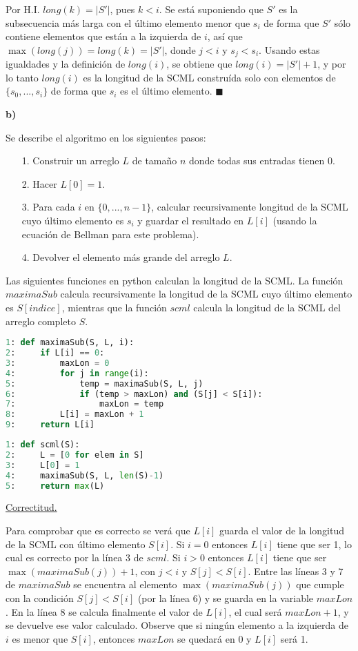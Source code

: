 \documentclass{article}
\begin{document}
Por H.I. $long(k) = |S'|$, pues $k < i$. Se está suponiendo que $S'$ es la subsecuencia más larga con el último elemento menor que $s_i$ de forma que $S'$ sólo contiene elementos que están a la izquierda de $i$, así que $\max (long(j)) = long(k) = |S'|$, donde $j<i$ y $s_j < s_i$. Usando estas igualdades y la definición de $long(i)$, se obtiene que $long(i) = |S'|+1$, y por lo tanto $long(i)$ es la longitud de la SCML construída solo con elementos de $\{ s_0, ..., s_i \}$ de forma que $s_i$ es el último elemento. $\blacksquare$

\textbf{b)}

Se describe el algoritmo en los siguientes pasos:

\begin{itemize}
\item[1.] Construir un arreglo $L$ de tamaño $n$ donde todas sus entradas tienen 0.
\item[2.] Hacer $L[0] = 1$.
\item[3.] Para cada $i$ en $\{0, ..., n-1\}$, calcular recursivamente longitud de la SCML cuyo último elemento es $s_i$ y guardar el resultado en $L[i]$ (usando la ecuación de Bellman para este problema).
\item[4.] Devolver el elemento más grande del arreglo $L$.
\end{itemize}

Las siguientes funciones en python calculan la longitud de la SCML. La función $maximaSub$ calcula recursivamente la longitud de la SCML cuyo último elemento es $S[indice]$, mientras que la función $scml$ calcula la longitud de la SCML del arreglo completo $S$.

\begin{lstlisting}[language=Python]
1: def maximaSub(S, L, i):
2:     if L[i] == 0:
3:         maxLon = 0
4:         for j in range(i):
5:             temp = maximaSub(S, L, j)
6:             if (temp > maxLon) and (S[j] < S[i]):
7:                 maxLon = temp
8:         L[i] = maxLon + 1
9:     return L[i]
\end{lstlisting}

\begin{lstlisting}[language=Python]
1: def scml(S):
2:     L = [0 for elem in S]
3:     L[0] = 1
4:     maximaSub(S, L, len(S)-1)
5:     return max(L)
\end{lstlisting}

\underline{Correctitud.}

Para comprobar que es correcto se verá que $L[i]$ guarda el valor de la longitud de la SCML con último elemento $S[i]$.
Si $i = 0$ entonces $L[i]$ tiene que ser 1, lo cual es correcto por la línea
3 de $scml$. Si $i>0$ entonces $L[i]$ tiene que ser $\max (maximaSub(j)) + 1$, con $j<i$ y $S[j] < S[i]$.
Entre las líneas 3 y 7 de $maximaSub$ se encuentra al elemento $\max (maximaSub(j))$ que cumple con la 
condición $S[j] < S[i]$ (por la línea 6) y se guarda en la variable $maxLon$. En la línea 8 se calcula
finalmente el valor de $L[i]$, el cual será $maxLon + 1$, y se devuelve ese valor calculado. Observe que si
ningún elemento a la izquierda de $i$ es menor que $S[i]$, entonces $maxLon$ se quedará en 0
y $L[i]$ será 1.
\end{document}
